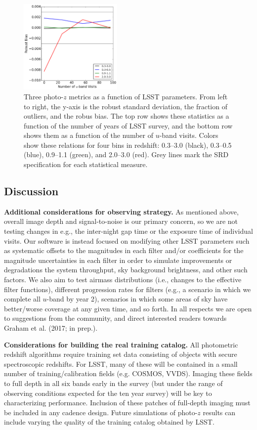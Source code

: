 \begin{figure}[h]
\begin{center}
\includegraphics[width=5cm]{figs/photoz/pstat_uvisits_bias.png}
\caption{Three photo-$z$ metrics as a function of LSST parameters. From
left to right, the y-axis is the robust standard deviation, the fraction of
outliers, and the robus bias. The top row shows these statistics as a function
of the number of years of LSST survey, and the bottom row shows them as
a function of the number of $u$-band visits. Colors show these relations
for four bins in redshift: 0.3--3.0 (black), 0.3--0.5 (blue), 0.9--1.1
(green), and 2.0--3.0 (red). Grey lines mark the SRD specification for
each statistical measure.
\label{fig:metrics}}
\end{center}
\end{figure}


\subsection{Discussion}

\textbf{Additional considerations for observing strategy.} As mentioned
above, overall image depth and signal-to-noise is our primary concern,
so we are not testing changes in e.g., the inter-night gap time or the
exposure time of individual visits.  Our software is instead focused on
modifying other LSST parameters such as systematic offsets to the
magnitudes in each filter and/or coefficients for the magnitude
uncertainties in each filter in order to simulate improvements or
degradations the system throughput, sky background brightness, and other
such factors. We also aim to test airmass distributions (i.e., changes
to the effective filter functions), different progression rates for
filters (e.g., a scenario in which we complete all $u$-band by year 2),
scenarios in which some areas of sky have better/worse coverage at any
given time, and so forth. In all respects we are open to suggestions
from the community, and direct interested readers towards Graham et al. (2017; in prep.).

\textbf{Considerations for building the real training catalog.} All
photometric redshift algorithms require training set data consisting of
objects with secure spectroscopic redshifts.  For LSST, many of these
will be contained in a small number of training/calibration fields (e.g.
COSMOS, VVDS).  Imaging these fields to full depth in all six bands
early in the survey (but under the range of observing conditions
expected for the ten year survey) will be key to characterizing
performance.  Inclusion of these patches of full-depth imaging must be
included in any cadence design. Future simulations of photo-$z$ results
can include varying the quality of the training catalog obtained by
LSST.

